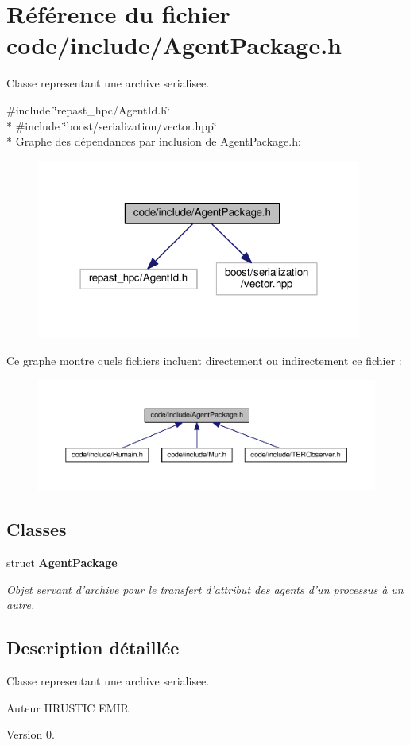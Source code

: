 \section{Référence du fichier code/include/\-Agent\-Package.h}
\label{_agent_package_8h}


Classe representant une archive serialisee.  


{\ttfamily \#include \char`\"{}repast\-\_\-hpc/\-Agent\-Id.\-h\char`\"{}}\\*
{\ttfamily \#include \char`\"{}boost/serialization/vector.\-hpp\char`\"{}}\\*
Graphe des dépendances par inclusion de Agent\-Package.\-h\-:
\nopagebreak
\begin{figure}[H]
\begin{center}
\leavevmode
\includegraphics[width=303pt]{_agent_package_8h__incl}
\end{center}
\end{figure}
Ce graphe montre quels fichiers incluent directement ou indirectement ce fichier \-:
\nopagebreak
\begin{figure}[H]
\begin{center}
\leavevmode
\includegraphics[width=350pt]{_agent_package_8h__dep__incl}
\end{center}
\end{figure}
\subsection*{Classes}
\begin{DoxyCompactItemize}
\item 
struct {\bf Agent\-Package}
\begin{DoxyCompactList}\small\item\em Objet servant d'archive pour le transfert d'attribut des agents d'un processus à un autre. \end{DoxyCompactList}\end{DoxyCompactItemize}


\subsection{Description détaillée}
Classe representant une archive serialisee. \begin{DoxyAuthor}{Auteur}
H\-R\-U\-S\-T\-I\-C E\-M\-I\-R 
\end{DoxyAuthor}
\begin{DoxyVersion}{Version}
0. 
\end{DoxyVersion}
